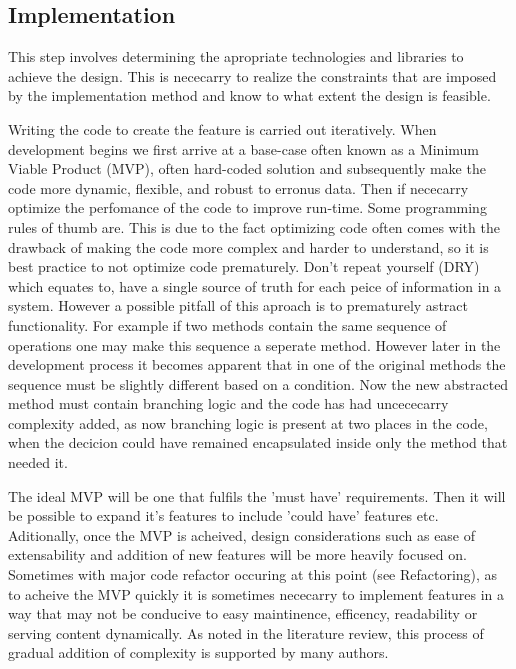   \subsection{Implementation}
    This step involves determining the apropriate technologies and libraries to achieve the design. This is nececarry to realize the constraints that are imposed by the implementation method and know to what extent the design is feasible.
    \par
    Writing the code to create the feature is carried out iteratively. When development begins we first arrive at a base-case often known as a Minimum Viable Product (MVP), often hard-coded solution and subsequently make the code more dynamic, flexible, and robust to erronus data. Then if nececarry optimize the perfomance of the code to improve run-time. Some programming rules of thumb are. \citep{Knuth1974} This is due to the fact optimizing code often comes with the drawback of making the code more complex and harder to understand, so it is best practice to not optimize code prematurely. Don't repeat yourself (DRY)\citep{hunt2000pragmatic} which equates to, have a single source of truth for each peice of information in a system. However a possible pitfall of this aproach is to prematurely astract functionality. For example if two methods contain the same sequence of operations one may make this sequence a seperate method. However later in the development process it becomes apparent that in one of the original methods the sequence must be slightly different based on a condition. Now the new abstracted method must contain branching logic and the code has had uncececarry complexity added, as now branching logic is present at two places in the code, when the decicion could have remained encapsulated inside only the method that needed it.
    \par
    The ideal MVP will be one that fulfils the 'must have' requirements. Then it will be possible to expand it's features to include 'could have' features etc. Aditionally, once the MVP is acheived, design considerations such as ease of extensability and addition of new features will be more heavily focused on. Sometimes with major code refactor occuring at this point (see Refactoring), as to acheive the MVP quickly it is sometimes nececarry to implement features in a way that may not be conducive to easy maintinence, efficency, readability or serving content dynamically. As noted in the literature review, this process of gradual addition of complexity is supported by many authors.


